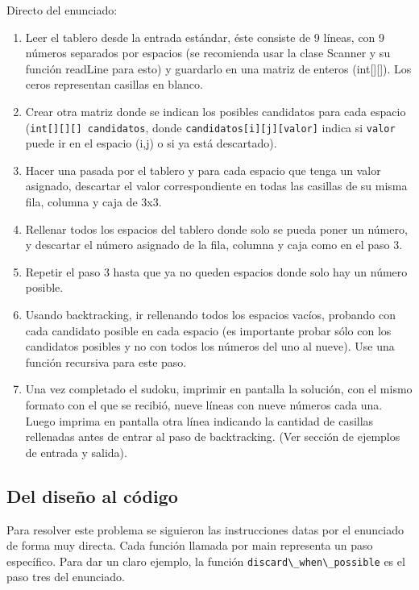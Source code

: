 \documentclass[
  spanish,
  a4paper,
,tablecaptionabove
]{scrartcl}
\newcommand{\passthrough}[1]{#1}
\providecommand{\tightlist}{%
  \setlength{\itemsep}{0pt}\setlength{\parskip}{0pt}}
\begin{document}
Directo del enunciado:

\begin{enumerate}
\def\labelenumi{\arabic{enumi}.}
\tightlist
\item
  Leer el tablero desde la entrada estándar, éste consiste de 9 líneas,
  con 9 números separados por espacios (se recomienda usar la clase
  Scanner y su función readLine para esto) y guardarlo en una matriz de
  enteros (int{[}{]}{[}{]}). Los ceros representan casillas en blanco.
\item
  Crear otra matriz donde se indican los posibles candidatos para cada
  espacio (\passthrough{\lstinline!int[][][] candidatos!}, donde
  \passthrough{\lstinline!candidatos[i][j][valor]!} indica si
  \passthrough{\lstinline!valor!} puede ir en el espacio (i,j) o si ya
  está descartado).
\item
  Hacer una pasada por el tablero y para cada espacio que tenga un valor
  asignado, descartar el valor correspondiente en todas las casillas de
  su misma fila, columna y caja de 3x3.
\item
  Rellenar todos los espacios del tablero donde solo se pueda poner un
  número, y descartar el número asignado de la fila, columna y caja como
  en el paso 3.
\item
  Repetir el paso 3 hasta que ya no queden espacios donde solo hay un
  número posible.
\item
  Usando backtracking, ir rellenando todos los espacios vacíos, probando
  con cada candidato posible en cada espacio (es importante probar sólo
  con los candidatos posibles y no con todos los números del uno al
  nueve). Use una función recursiva para este paso.
\item
  Una vez completado el sudoku, imprimir en pantalla la solución, con el
  mismo formato con el que se recibió, nueve líneas con nueve números
  cada una. Luego imprima en pantalla otra línea indicando la cantidad
  de casillas rellenadas antes de entrar al paso de backtracking. (Ver
  sección de ejemplos de entrada y salida).
\end{enumerate}

\hypertarget{del-diseuxf1o-al-cuxf3digo}{%
\subsection{Del diseño al código}\label{del-diseuxf1o-al-cuxf3digo}}

Para resolver este problema se siguieron las instrucciones datas por el
enunciado de forma muy directa. Cada función llamada por main representa
un paso específico. Para dar un claro ejemplo, la función
\passthrough{\lstinline!discard\_when\_possible!} es el paso tres del
enunciado.
\end{document}
